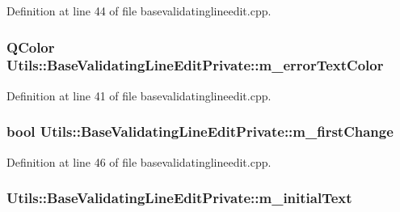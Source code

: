 \-Definition at line 44 of file basevalidatinglineedit.\-cpp.

\hypertarget{struct_utils_1_1_base_validating_line_edit_private_aaa0cb150a25e8081973452da11520ca8}{
\subsubsection[{m\-\_\-error\-Text\-Color}]{\setlength{\rightskip}{0pt plus 5cm}\-Q\-Color {\bf \-Utils\-::\-Base\-Validating\-Line\-Edit\-Private\-::m\-\_\-error\-Text\-Color}}}\label{struct_utils_1_1_base_validating_line_edit_private_aaa0cb150a25e8081973452da11520ca8}


\-Definition at line 41 of file basevalidatinglineedit.\-cpp.

\hypertarget{struct_utils_1_1_base_validating_line_edit_private_aa380be78e3a48cb452f02706411f99f9}{
\subsubsection[{m\-\_\-first\-Change}]{\setlength{\rightskip}{0pt plus 5cm}bool {\bf \-Utils\-::\-Base\-Validating\-Line\-Edit\-Private\-::m\-\_\-first\-Change}}}\label{struct_utils_1_1_base_validating_line_edit_private_aa380be78e3a48cb452f02706411f99f9}


\-Definition at line 46 of file basevalidatinglineedit.\-cpp.

\hypertarget{struct_utils_1_1_base_validating_line_edit_private_a8e2897fda859a5d9d1d8d5c02fd72c85}{
\subsubsection[{m\-\_\-initial\-Text}]{ {\bf \-Utils\-::\-Base\-Validating\-Line\-Edit\-Private\-::m\-\_\-initial\-Text}}}\label{struct_utils_1_1_base_validating_line_edit_private_a8e2897fda859a5d9d1d8d5c02fd72c85}


